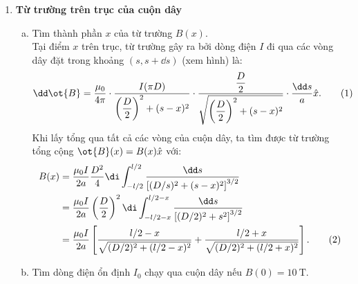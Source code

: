 \begin{loigiai}\[\]
\begin{enumerate}[1)]
    \item \textbf{Từ trường trên trục của cuộn dây}
    \begin{enumerate}[a)]
        \item Tìm thành phần $x$ của từ trường $B(x)$.\\
        Tại điểm $x$ trên trục, từ trường gây ra bởi dòng điện $I$ đi qua các vòng dây đặt trong khoảng $(s,s+\dd s)$ (xem hình) là:
        \[\dd \ot{B}=\dfrac{\mu_{0}}{4 \pi} \cdot \dfrac{I(\pi D)}{\left(\dfrac{D}{2}\right)^{2}+(s-x)^{2}} \cdot \dfrac{\dfrac{D}{2}}{\sqrt{\left(\dfrac{D}{2}\right)^{2}+(s-x)^{2}}} \cdot \dfrac{\dd s}{a} \hat{x}.\tag{1}
\]
Khi lấy tổng qua tất cả các vòng của cuộn dây, ta tìm được từ trường tổng cộng $\ot{B}(x)=B(x)\hat{x}$ với:
\begin{align*}
    B(x) &= \dfrac{\mu_0 I}{2a} \dfrac{D^2}{4} \di \int_{-l/2}^{l/2} \dfrac{\dd s}{\left[(D/s)^2 +(s-x)^2 \right]^{3/2} }\\
    &=\dfrac{\mu_0 I}{2a} \left(\dfrac{D}{2}\right)^2 \di \int_{-l/2 -x}^{l/2-x} \dfrac{\dd s}{\left[(D/2)^2+s^2 \right]^{3/2} }\\
    &=\dfrac{\mu_0 I}{2a} \left[\dfrac{l/2-x}{\sqrt{(D/2)^2 +(l/2-x)^2}} + \dfrac{l/2 +x}{\sqrt{(D/2)^2+(l/2+x)^2}} \right]. \tag{2} \label{iku2}
\end{align*}
\item Tìm dòng điện ổn định $I_0$ chạy qua cuộn dây nếu $B(0)=10 ~\mathrm{T}$.
\begin{center}

\end{center}
\end{enumerate}
\end{enumerate}
\end{loigiai}

